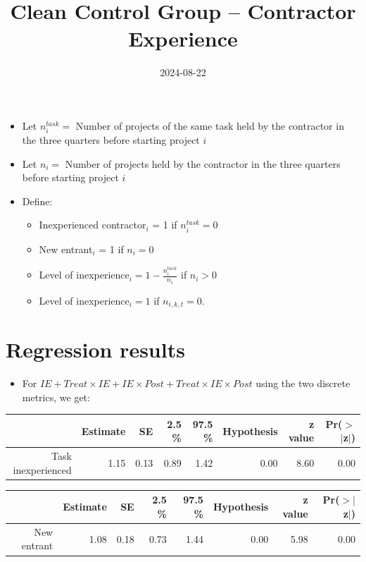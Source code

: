 \documentclass[
]{article}
\title{Clean Control Group -- Contractor Experience}
\author{}
\date{\vspace{-2.5em}2024-08-22}
\providecommand{\tightlist}{%
  \setlength{\itemsep}{0pt}\setlength{\parskip}{0pt}}
\begin{document}
\maketitle

\begin{itemize}
\item
  Let \(n^{task}_{i}=\) Number of projects of the same task held by the
  contractor in the three quarters before starting project \(i\)
\item
  Let \(n_{i}=\) Number of projects held by the contractor in the three
  quarters before starting project \(i\)
\item
  Define:

  \begin{itemize}
  \tightlist
  \item
    Inexperienced contractor\(_i\) = 1 if \(n^{task}_{i}=0\)
  \item
    New entrant\(_i\) = 1 if \(n_{i}=0\)
  \item
    Level of inexperience\(_{i}= 1 - \frac{n^{task}_{i}}{n_{i}}\) if
    \(n_{i}>0\)
  \item
    Level of inexperience\(_{i}= 1\) if \(n_{i,k,t}=0\).
  \end{itemize}
\end{itemize}

\hypertarget{regression-results}{%
\section{Regression results}\label{regression-results}}

\begin{itemize}
\tightlist
\item
  For
  \(IE + Treat \times IE + IE \times Post + Treat \times IE \times Post\)
  using the two discrete metrics, we get:
\end{itemize}

\begin{table}[ht]
\centering
\begin{tabular}{rrrrrrrr}
  \hline
 & Estimate & SE & 2.5 \% & 97.5 \% & Hypothesis & z value & Pr($>$$|$z$|$) \\ 
  \hline
Task inexperienced & 1.15 & 0.13 & 0.89 & 1.42 & 0.00 & 8.60 & 0.00 \\ 
   \hline
\end{tabular}
\end{table}
\begin{table}[ht]
\centering
\begin{tabular}{rrrrrrrr}
  \hline
 & Estimate & SE & 2.5 \% & 97.5 \% & Hypothesis & z value & Pr($>$$|$z$|$) \\ 
  \hline
New entrant & 1.08 & 0.18 & 0.73 & 1.44 & 0.00 & 5.98 & 0.00 \\ 
   \hline
\end{tabular}
\end{table}
\end{document}
